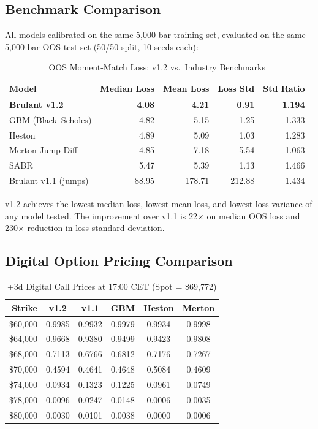 \documentclass[11pt,a4paper]{article}
\begin{document}
\subsection{Benchmark Comparison}

All models calibrated on the same 5{,}000-bar training set, evaluated
on the same 5{,}000-bar OOS test set (50/50 split, 10 seeds each):

\begin{table}[H]
\centering
\caption{OOS Moment-Match Loss: v1.2 vs.\ Industry Benchmarks}
\label{tab:v12_benchmark}
\small
\begin{tabular}{lrrrr}
\toprule
\textbf{Model} & \textbf{Median Loss} & \textbf{Mean Loss} & \textbf{Loss Std} & \textbf{Std Ratio} \\
\midrule
\textbf{Brulant v1.2} & \textbf{4.08} & \textbf{4.21} & \textbf{0.91} & \textbf{1.194} \\
GBM (Black--Scholes)  & 4.82 & 5.15 & 1.25 & 1.333 \\
Heston                & 4.89 & 5.09 & 1.03 & 1.283 \\
Merton Jump-Diff      & 4.85 & 7.18 & 5.54 & 1.063 \\
SABR                  & 5.47 & 5.39 & 1.13 & 1.466 \\
Brulant v1.1 (jumps)  & 88.95 & 178.71 & 212.88 & 1.434 \\
\bottomrule
\end{tabular}
\end{table}

v1.2 achieves the lowest median loss, lowest mean loss, and lowest loss
variance of any model tested. The improvement over v1.1 is 22$\times$
on median OOS loss and 230$\times$ reduction in loss standard deviation.

\subsection{Digital Option Pricing Comparison}

\begin{table}[H]
\centering
\caption{+3d Digital Call Prices at 17:00 CET (Spot = \$69{,}772)}
\label{tab:v12_pricing}
\small
\begin{tabular}{r|ccccc}
\toprule
\textbf{Strike} & \textbf{v1.2} & \textbf{v1.1} & \textbf{GBM} & \textbf{Heston} & \textbf{Merton} \\
\midrule
\$60{,}000 & 0.9985 & 0.9932 & 0.9979 & 0.9934 & 0.9998 \\
\$64{,}000 & 0.9668 & 0.9380 & 0.9499 & 0.9423 & 0.9808 \\
\$68{,}000 & 0.7113 & 0.6766 & 0.6812 & 0.7176 & 0.7267 \\
\$70{,}000 & 0.4594 & 0.4641 & 0.4648 & 0.5084 & 0.4609 \\
\$74{,}000 & 0.0934 & 0.1323 & 0.1225 & 0.0961 & 0.0749 \\
\$78{,}000 & 0.0096 & 0.0247 & 0.0148 & 0.0006 & 0.0035 \\
\$80{,}000 & 0.0030 & 0.0101 & 0.0038 & 0.0000 & 0.0006 \\
\bottomrule
\end{tabular}
\end{table}
\end{document}
